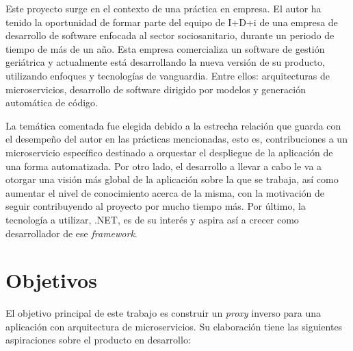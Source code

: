 \documentclass[11pt,spanish,listoffigures]{tfgetsinf}
\begin{document}
Este proyecto surge en el contexto de una práctica en empresa. El autor ha tenido la oportunidad de formar parte del equipo de I+D+i de una empresa de desarrollo de software enfocada al sector sociosanitario, durante un periodo de tiempo de más de un año. Esta empresa comercializa un software de gestión geriátrica y actualmente está desarrollando la nueva versión de su producto, utilizando enfoques y tecnologías de vanguardia. Entre ellos: arquitecturas de microservicios, desarrollo de software dirigido por modelos y generación automática de código.

La temática comentada fue elegida debido a la estrecha relación que guarda con el desempeño del autor en las prácticas mencionadas, esto es, contribuciones a un microservicio específico destinado a orquestar el despliegue de la aplicación de una forma automatizada. Por otro lado, el desarrollo a llevar a cabo le va a otorgar una visión más global de la aplicación sobre la que se trabaja, así como aumentar el nivel de conocimiento acerca de la misma, con la motivación de seguir contribuyendo al proyecto por mucho tiempo más. Por último, la tecnología a utilizar, .NET, es de su interés y aspira así a crecer como desarrollador de ese \emph{framework}.


	\section{Objetivos}

El objetivo principal de este trabajo es construir un \emph{proxy} inverso para una aplicación con arquitectura de microservicios. Su elaboración tiene las siguientes aspiraciones sobre el producto en desarrollo:
\end{document}
